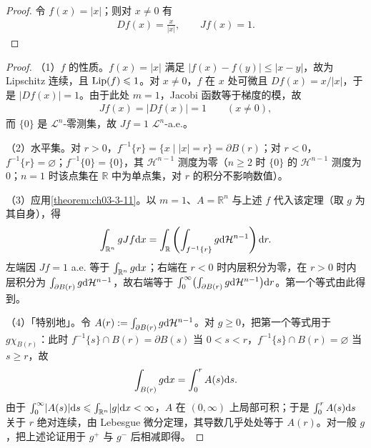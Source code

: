 \documentclass[../../main.tex]{subfiles}%
\begin{document}
\begin{proof}
令 $f(x)=\lvert x\rvert$；则对 $x\neq0$ 有
\begin{align*}
Df(x)=\frac{x}{\lvert x\rvert},\qquad Jf(x)=1.
\end{align*}
\end{proof}

\begin{proof}
（1）$f$ 的性质。$f(x)=\lvert x\rvert$ 满足 $\lvert f(x)-f(y)\rvert\leqslant\lvert x-y\rvert$，故为 Lipschitz 连续，且 $\operatorname{Lip}(f)\leqslant1$。对 $x\neq0$，$f$ 在 $x$ 处可微且 $Df(x)=x/\lvert x\rvert$，于是 $\lvert Df(x)\rvert=1$。由于此处 $m=1$，Jacobi 函数等于梯度的模，故
\begin{align*}
Jf(x)=\lvert Df(x)\rvert=1\qquad(x\neq0),
\end{align*}
而 $\{0\}$ 是 $\mathcal{L}^n$-零测集，故 $Jf=1$ $\mathcal{L}^n$-a.e.。

（2）水平集。对 $r>0$，$f^{-1}\{r\}=\{x\mid\lvert x\rvert=r\}=\partial B(r)$；对 $r<0$，$f^{-1}\{r\}=\varnothing$；$f^{-1}\{0\}=\{0\}$，其 $\mathcal{H}^{n-1}$ 测度为零（$n\geqslant2$ 时 $\{0\}$ 的 $\mathcal{H}^{n-1}$ 测度为 $0$；$n=1$ 时该点集在 $\mathbb{R}$ 中为单点集，对 $r$ 的积分不影响数值）。

（3）应用\cref{theorem:ch03-3-11}。以 $m=1$、$A=\mathbb{R}^n$ 与上述 $f$ 代入该定理（取 $g$ 为其自身），得%
\begin{align*}
\int_{\mathbb{R}^n}gJf\mathrm{d} x=\int_{\mathbb{R}}\left(\int_{f^{-1}\{r\}}g\mathrm{d}\mathcal{H}^{n-1}\right)\mathrm{d} r.
\end{align*}
左端因 $Jf=1$ a.e. 等于 $\int_{\mathbb{R}^n}g\mathrm{d} x$；右端在 $r<0$ 时内层积分为零，在 $r>0$ 时内层积分为 $\int_{\partial B(r)}g\mathrm{d}\mathcal{H}^{n-1}$，故右端等于 $\int_0^{\infty}\bigl(\int_{\partial B(r)}g\mathrm{d}\mathcal{H}^{n-1}\bigr)\mathrm{d} r$。第一个等式由此得到。

（4）「特别地」。令 $A(r):=\int_{\partial B(r)}g\mathrm{d}\mathcal{H}^{n-1}$。对 $g\geqslant0$，把第一个等式用于 $g\chi_{B(r)}$：此时 $f^{-1}\{s\}\cap B(r)=\partial B(s)$ 当 $0<s<r$，$f^{-1}\{s\}\cap B(r)=\varnothing$ 当 $s\geqslant r$，故
\begin{align*}
\int_{B(r)}g\mathrm{d} x=\int_0^rA(s)\mathrm{d} s.
\end{align*}
由于 $\int_0^{\infty}\lvert A(s)\rvert\mathrm{d} s\leqslant\int_{\mathbb{R}^n}\lvert g\rvert\mathrm{d} x<\infty$，$A$ 在 $(0,\infty)$ 上局部可积；于是 $\int_0^rA(s)\mathrm{d} s$ 关于 $r$ 绝对连续，由 Lebesgue 微分定理，其导数几乎处处等于 $A(r)$。对一般 $g$，把上述论证用于 $g^{+}$ 与 $g^{-}$ 后相减即得。
\end{proof}
\end{document}
